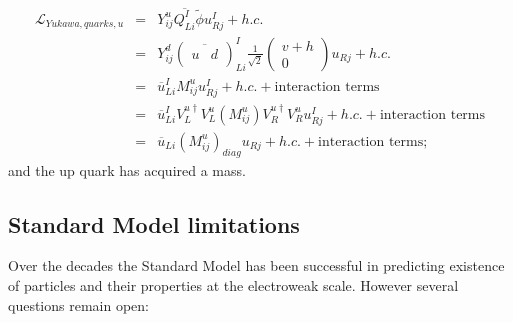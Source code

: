 \begin{eqnarray}
\mathcal L_{Yukawa,quarks,u} &=&  Y^u_{ij}\overline{Q^I_{Li}}\tilde{\phi} u^I_{Rj} + h.c. \nonumber \\
&=& Y^d_{ij}  \left( \overline{ \begin{array}{cc} u & d \end{array} } \right)^I_{Li}  \frac{1}{\sqrt{2}}  \left( \begin{array}{c} v + h \\ 0 \end{array} \right)  u_{Rj} + h.c.\nonumber \\ 
&=& \overline{u}^I_{Li}M^u_{ij}u^I_{Rj} + h.c. + \mbox{interaction terms} \nonumber \\
&=& \overline{u}^I_{Li}V^{u\dag}_LV^u_L(M^u_{ij})V^{u\dag}_R V^u_Ru^I_{Rj} + h.c. + \mbox{interaction terms} \nonumber\\
&=& \overline{u}_{Li}(M^u_{ij})_{diag}u_{Rj} + h.c. + \mbox{interaction terms};
\label{eqn:SMLYukawaUquark}
\end{eqnarray}
and the up quark has acquired a mass.

\clearpage

\subsection{Standard Model limitations}

Over the decades the Standard Model has been successful in predicting existence of particles and their properties at the electroweak scale. However several questions remain open:

